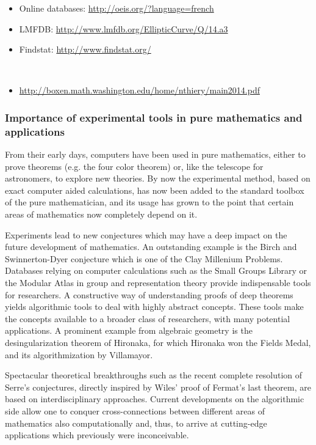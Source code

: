 {\begin{description}
    \begin{itemize}
    \item Online databases: \url{http://oeis.org/?language=french}
    \item LMFDB: \url{http://www.lmfdb.org/EllipticCurve/Q/14.a3}
    \item Findstat: \url{http://www.findstat.org/}
    \end{itemize}
  \item[Example of graphical material]\ 
    \begin{itemize}
    \item \url{http://boxen.math.washington.edu/home/nthiery/main2014.pdf}
    \end{itemize}
  \end{description}
}

\clearpage

\subsubsection{Importance of experimental tools in pure mathematics
  and applications}

From their early days, computers have been used in pure mathematics,
either to prove theorems (e.g. the four color theorem) or, like the
telescope for astronomers, to explore new theories. By now the
experimental method, based on exact computer aided calculations, has
now been added to the standard toolbox of the pure mathematician, and
its usage has grown to the point that certain areas of mathematics now
completely depend on it.

Experiments lead to new conjectures which may have a deep impact on
the future development of mathematics. An outstanding example is the
Birch and Swinnerton-Dyer conjecture which is one of the Clay
Millenium Problems.  Databases relying on computer calculations such
as the Small Groups Library or the Modular Atlas in group and
representation theory provide indispensable tools for researchers. A
constructive way of understanding proofs of deep theorems yields
algorithmic tools to deal with highly abstract concepts. These tools
make the concepts available to a broader class of researchers, with
many potential applications. A prominent example from algebraic
geometry is the desingularization theorem of Hironaka, for which
Hironaka won the Fields Medal, and its algorithmization by Villamayor.

Spectacular theoretical breakthroughs such as the recent complete
resolution of Serre's conjectures, directly inspired by Wiles' proof
of Fermat's last theorem, are based on interdisciplinary approaches.
Current developments on the algorithmic side allow one to conquer
cross-connections between different areas of mathematics also
computationally and, thus, to arrive at cutting-edge applications
which previously were inconceivable.

